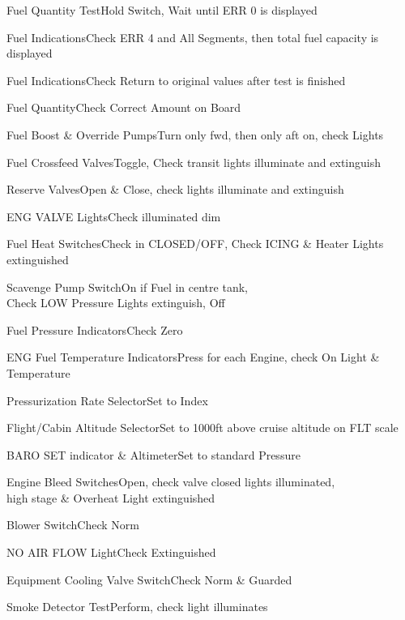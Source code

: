 \documentclass[sim-use, blue_items]{checklist}
\begin{document}
\begin{continuedchecklist}
	 {
		\item{Fuel Quantity Test}{Hold Switch, Wait until ERR 0 is displayed}
		\item{Fuel Indications}{Check ERR 4 and All Segments, then total fuel capacity is displayed}
		\item{Fuel Indications}{Check Return to original values after test is finished}
		\item{Fuel Quantity}{Check Correct Amount on Board}
		\item{Fuel Boost \& Override Pumps}{Turn only fwd, then only aft on, check Lights}
		\item{Fuel Crossfeed Valves}{Toggle, Check transit lights illuminate and extinguish}
		\item{Reserve Valves}{Open \& Close, check lights illuminate and extinguish}
		\item{ENG VALVE Lights}{Check illuminated dim}
		\item{Fuel Heat Switches}{Check in CLOSED/OFF, Check ICING \& Heater Lights extinguished}
		\item{Scavenge Pump Switch}{On if Fuel in centre tank,\\Check LOW Pressure Lights extinguish, Off}
		\item{Fuel Pressure Indicators}{Check Zero}
		\item{ENG Fuel Temperature Indicators}{Press for each Engine, check On Light \& Temperature}
	}
	 {
		\item{Pressurization Rate Selector}{Set to Index}
		\item{Flight/Cabin Altitude Selector}{Set to 1000ft above cruise altitude on FLT scale}
		\item{BARO SET indicator \& Altimeter}{Set to standard Pressure}
	}
	\item{Engine Bleed Switches}{Open, check valve closed lights illuminated,\\high stage \& Overheat Light extinguished}
	 {
		\item{Blower Switch}{Check Norm}
		\item{NO AIR FLOW Light}{Check Extinguished}
		\item{Equipment Cooling Valve Switch}{Check Norm \& Guarded}
		\item{Smoke Detector Test}{Perform, check light illuminates}
	}
\end{continuedchecklist}
\end{document}
